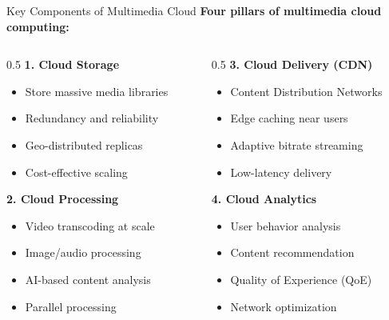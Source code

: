 \documentclass[aspectratio=169,12pt]{beamer}
\begin{document}
\begin{frame}{Key Components of Multimedia Cloud}
    \textbf{Four pillars of multimedia cloud computing:}
    
    \vspace{0.3cm}
    \begin{columns}
        \begin{column}{0.5\textwidth}
            \textbf{1. Cloud Storage}
            \begin{itemize}
                \item Store massive media libraries
                \item Redundancy and reliability
                \item Geo-distributed replicas
                \item Cost-effective scaling
            \end{itemize}
            
            \vspace{0.3cm}
            \textbf{2. Cloud Processing}
            \begin{itemize}
                \item Video transcoding at scale
                \item Image/audio processing
                \item AI-based content analysis
                \item Parallel processing
            \end{itemize}
        \end{column}
        \begin{column}{0.5\textwidth}
            \textbf{3. Cloud Delivery (CDN)}
            \begin{itemize}
                \item Content Distribution Networks
                \item Edge caching near users
                \item Adaptive bitrate streaming
                \item Low-latency delivery
            \end{itemize}
            
            \vspace{0.3cm}
            \textbf{4. Cloud Analytics}
            \begin{itemize}
                \item User behavior analysis
                \item Content recommendation
                \item Quality of Experience (QoE)
                \item Network optimization
            \end{itemize}
        \end{column}
    \end{columns}
\end{frame}
\end{document}
